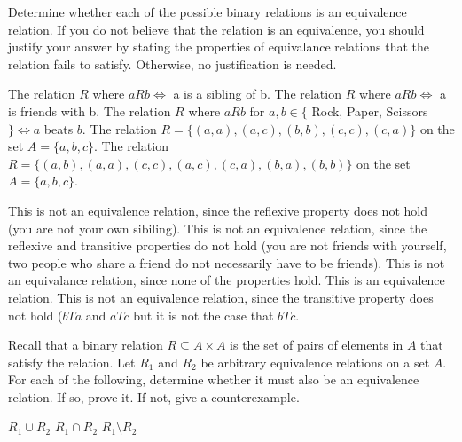 \documentclass[solution, letterpaper]{cs20}
\begin{document}




Determine whether each of the possible binary relations is an equivalence relation. If you do not believe that the relation is an equivalence, you should justify your answer by stating the properties of equivalance relations that the relation fails to satisfy. Otherwise, no justification is needed.

\subproblem The relation $R$ where $aRb \iff$ a is a sibling of b.
\subproblem The relation $R$ where $aRb \iff$ a is friends with b.
\subproblem The relation $R$ where $aRb$ for $a, b \in \{$ Rock, Paper, Scissors $\} \iff a$ beats $b$.
\subproblem The relation $R = \{(a, a), (a, c), (b, b), (c, c), (c, a) \}$ on the set $A = \{a, b, c\}$.
\subproblem The relation $R = \{(a, b), (a, a), (c, c), (a, c), (c, a), (b, a), (b, b) \}$ on the set $A = \{a, b, c\}$.

\solution

\subsolution This is not an equivalence relation, since the reflexive property does not hold (you are not your own sibiling).
\subsolution This is not an equivalence relation, since the reflexive and transitive properties do not hold (you are not friends with yourself, two people who share a friend do not necessarily have to be friends).
\subsolution This is not an equivalance relation, since none of the properties hold.
\subsolution This is an equivalence relation.
\subsolution This is not an equivalence relation, since the transitive property does not hold ($bTa$ and $aTc$ but it is not the case that $bTc$.


Recall that a binary relation $R \subseteq A \times A$ is the set of pairs of elements in $A$ that satisfy the relation. Let $R_1$ and $R_2$ be arbitrary equivalence relations on a set $A$. For each of the following, determine whether it must also be an equivalence relation. If so, prove it. If not, give a counterexample.

\subproblem $R_1 \cup R_2$
\subproblem $R_1 \cap R_2$
\subproblem $R_1 \setminus R_2$
\end{document}

